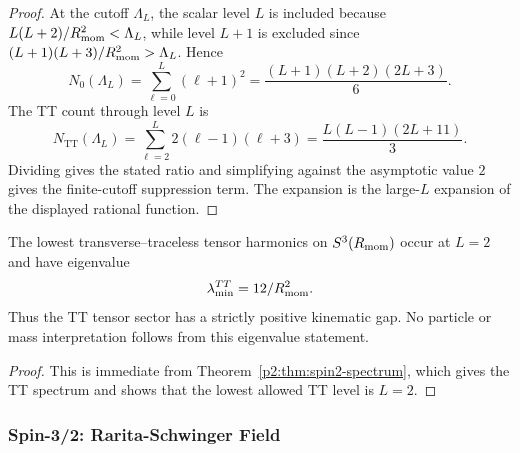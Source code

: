 \documentclass[12pt,a4paper]{article}
\begin{document}
\begin{proof}
At the cutoff $\Lambda_L$, the scalar level $L$ is included because $L(L+2)/R_{\mathrm{mom}}^2<\Lambda_L$, while level $L+1$ is excluded since $(L+1)(L+3)/R_{\mathrm{mom}}^2>\Lambda_L$.  Hence
\[
N_0(\Lambda_L)=\sum_{\ell=0}^L(\ell+1)^2=\frac{(L+1)(L+2)(2L+3)}6.
\]
The TT count through level $L$ is
\[
N_{\mathrm{TT}}(\Lambda_L)=\sum_{\ell=2}^L2(\ell-1)(\ell+3)=\frac{L(L-1)(2L+11)}3.
\]
Dividing gives the stated ratio and simplifying against the asymptotic value $2$ gives the finite-cutoff suppression term.  The expansion is the large-$L$ expansion of the displayed rational function.
\end{proof}


\begin{corollary}
\label{p2:cor:lowest-tt-gap}
The lowest transverse--traceless tensor harmonics on $S^3(R_{\mathrm{mom}})$ occur at $L=2$ and have eigenvalue
\begin{equation}
\lambda_{\min}^{TT}=12/R_{\mathrm{mom}}^2.
\end{equation}
Thus the TT tensor sector has a strictly positive kinematic gap.  No
particle or mass interpretation follows from this eigenvalue statement.
\end{corollary}

\begin{proof}
This is immediate from Theorem~\ref{p2:thm:spin2-spectrum}, which gives the TT spectrum and shows that the lowest allowed TT level is $L=2$.
\end{proof}


\subsubsection{Spin-3/2: Rarita-Schwinger Field}
\end{document}
